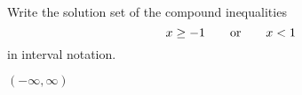 

Write the solution set of the compound inequalities
\[x\geq -1\text{\quad\quad or\quad\quad}  x <1 \]
in interval notation.

\begin{solution}
$(-\infty, \infty)$
\end{solution}